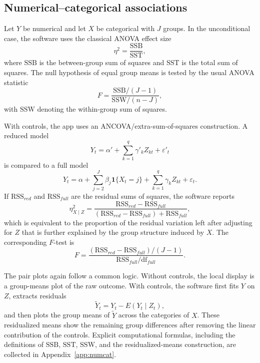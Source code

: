 \documentclass[11pt]{article}
\begin{document}
\subsection{Numerical--categorical associations}
\label{sec:numcat}

Let $Y$ be numerical and let $X$ be categorical with $J$ groups. In the
unconditional case, the software uses the classical ANOVA effect size
\begin{equation*}
\eta^2 = \frac{\mathrm{SSB}}{\mathrm{SST}},
\end{equation*}
where $\mathrm{SSB}$ is the between-group sum of squares and $\mathrm{SST}$ is
the total sum of squares. The null hypothesis of equal group means is tested by
the usual ANOVA statistic
\begin{equation*}
F = \frac{\mathrm{SSB}/(J-1)}{\mathrm{SSW}/(n-J)},
\end{equation*}
with $\mathrm{SSW}$ denoting the within-group sum of squares.

With controls, the app uses an ANCOVA/extra-sum-of-squares construction. A
reduced model
\begin{equation*}
Y_t = \alpha' + \sum_{k=1}^{q}\gamma'_k Z_{kt} + \varepsilon'_t
\end{equation*}
is compared to a full model
\begin{equation*}
Y_t = \alpha + \sum_{j=2}^{J}\beta_j \mathbf{1}\{X_t = j\}
      + \sum_{k=1}^{q}\gamma_k Z_{kt} + \varepsilon_t.
\end{equation*}
If $\mathrm{RSS}_{red}$ and $\mathrm{RSS}_{full}$ are the residual sums of
squares, the software reports
\begin{equation*}
\eta^2_{X\mid Z} =
\frac{\mathrm{RSS}_{red} - \mathrm{RSS}_{full}}
     {(\mathrm{RSS}_{red} - \mathrm{RSS}_{full}) + \mathrm{RSS}_{full}},
\end{equation*}
which is equivalent to the proportion of the residual variation left after
adjusting for $Z$ that is further explained by the group structure induced by
$X$. The corresponding $F$-test is
\begin{equation*}
F =
\frac{(\mathrm{RSS}_{red} - \mathrm{RSS}_{full})/(J-1)}
     {\mathrm{RSS}_{full}/\mathrm{df}_{full}}.
\end{equation*}

The pair plots again follow a common logic. Without controls, the local display
is a group-means plot of the raw outcome. With controls, the software first
fits $Y$ on $Z$, extracts residuals
\begin{equation*}
\tilde{Y}_t = Y_t - \widehat{E}(Y_t \mid Z_t),
\end{equation*}
and then plots the group means of $\tilde{Y}$ across the categories of $X$.
These residualized means show the remaining group differences after removing
the linear contribution of the controls. Explicit computational formulas,
including the definitions of $\mathrm{SSB}$, $\mathrm{SST}$, $\mathrm{SSW}$,
and the residualized-means construction, are collected in
Appendix~\ref{app:numcat}.
\end{document}
